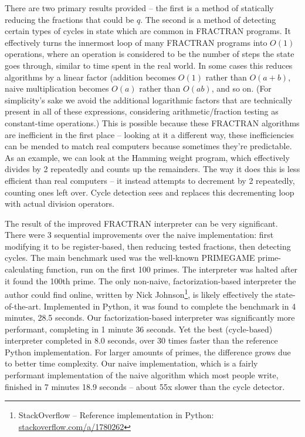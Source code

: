 \documentclass[12pt]{article}
\begin{document}
There are two primary results provided -- the first is a method of statically reducing the fractions that could be $q$. The second is a method of detecting certain types of cycles in state which are common in FRACTRAN programs. It effectively turns the innermost loop of many FRACTRAN programs into $O(1)$ operations, where an operation is considered to be the number of steps the state goes through, similar to time spent in the real world. In some cases this reduces algorithms by a linear factor (addition becomes $O(1)$ rather than $O(a + b)$, naive multiplication becomes $O(a)$ rather than $O(ab)$, and so on. (For simplicity's sake we avoid the additional logarithmic factors that are technically present in all of these expressions, considering arithmetic/fraction testing as constant-time operations.) This is possible because these FRACTRAN algorithms are inefficient in the first place -- looking at it a different way, these inefficiencies can be mended to match real computers because sometimes they're predictable. As an example, we can look at the Hamming weight program, which effectively divides by 2 repeatedly and counts up the remainders. The way it does this is less efficient than real computers -- it instead attempts to decrement by 2 repeatedly, counting ones left over. Cycle detection sees and replaces this decrementing loop with actual division operators.

The result of the improved FRACTRAN interpreter can be very significant. There were 3 sequential improvements over the naive implementation: first modifying it to be register-based, then reducing tested fractions, then detecting cycles. The main benchmark used was the well-known PRIMEGAME prime-calculating function, run on the first 100 primes. The interpreter was halted after it found the 100th prime. The only non-naive, factorization-based interpreter the author could find online, written by Nick Johnson\footnote{StackOverflow -- Reference implementation in Python: \url{stackoverflow.com/a/1780262}}, is likely effectively the state-of-the-art. Implemented in Python, it was found to complete the benchmark in 4 minutes, 28.5 seconds. Our factorization-based interpreter was significantly more performant, completing in 1 minute 36 seconds. Yet the best (cycle-based) interpreter completed in 8.0 seconds, over 30 times faster than the reference Python implementation. For larger amounts of primes, the difference grows due to better time complexity. Our naive implementation, which is a fairly performant implementation of the naive algorithm which most people write, finished in 7 minutes 18.9 seconds -- about 55x slower than the cycle detector.
\end{document}
